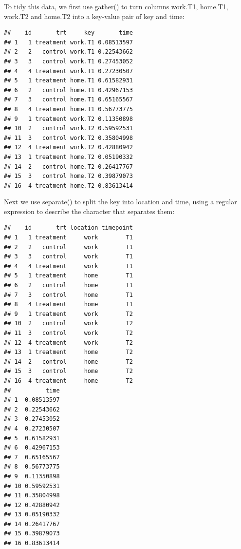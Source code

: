 \documentclass[]{book}
\newenvironment{Shaded}{\begin{snugshade}}{\end{snugshade}}
\newcommand{\CharTok}[1]{\textcolor[rgb]{0.31,0.60,0.02}{#1}}
\newcommand{\DataTypeTok}[1]{\textcolor[rgb]{0.13,0.29,0.53}{#1}}
\newcommand{\KeywordTok}[1]{\textcolor[rgb]{0.13,0.29,0.53}{\textbf{#1}}}
\newcommand{\NormalTok}[1]{#1}
\newcommand{\OperatorTok}[1]{\textcolor[rgb]{0.81,0.36,0.00}{\textbf{#1}}}
\newcommand{\StringTok}[1]{\textcolor[rgb]{0.31,0.60,0.02}{#1}}
\begin{document}
To tidy this data, we first use gather() to turn columns work.T1, home.T1, work.T2 and home.T2 into a key-value pair of key and time:

\begin{Shaded}
\end{Shaded}

\begin{verbatim}
##    id       trt     key       time
## 1   1 treatment work.T1 0.08513597
## 2   2   control work.T1 0.22543662
## 3   3   control work.T1 0.27453052
## 4   4 treatment work.T1 0.27230507
## 5   1 treatment home.T1 0.61582931
## 6   2   control home.T1 0.42967153
## 7   3   control home.T1 0.65165567
## 8   4 treatment home.T1 0.56773775
## 9   1 treatment work.T2 0.11350898
## 10  2   control work.T2 0.59592531
## 11  3   control work.T2 0.35804998
## 12  4 treatment work.T2 0.42880942
## 13  1 treatment home.T2 0.05190332
## 14  2   control home.T2 0.26417767
## 15  3   control home.T2 0.39879073
## 16  4 treatment home.T2 0.83613414
\end{verbatim}

Next we use separate() to split the key into location and time, using a regular expression to describe the character that separates them:

\begin{Shaded}
\end{Shaded}

\begin{verbatim}
##    id       trt location timepoint
## 1   1 treatment     work        T1
## 2   2   control     work        T1
## 3   3   control     work        T1
## 4   4 treatment     work        T1
## 5   1 treatment     home        T1
## 6   2   control     home        T1
## 7   3   control     home        T1
## 8   4 treatment     home        T1
## 9   1 treatment     work        T2
## 10  2   control     work        T2
## 11  3   control     work        T2
## 12  4 treatment     work        T2
## 13  1 treatment     home        T2
## 14  2   control     home        T2
## 15  3   control     home        T2
## 16  4 treatment     home        T2
##          time
## 1  0.08513597
## 2  0.22543662
## 3  0.27453052
## 4  0.27230507
## 5  0.61582931
## 6  0.42967153
## 7  0.65165567
## 8  0.56773775
## 9  0.11350898
## 10 0.59592531
## 11 0.35804998
## 12 0.42880942
## 13 0.05190332
## 14 0.26417767
## 15 0.39879073
## 16 0.83613414
\end{verbatim}
\end{document}

